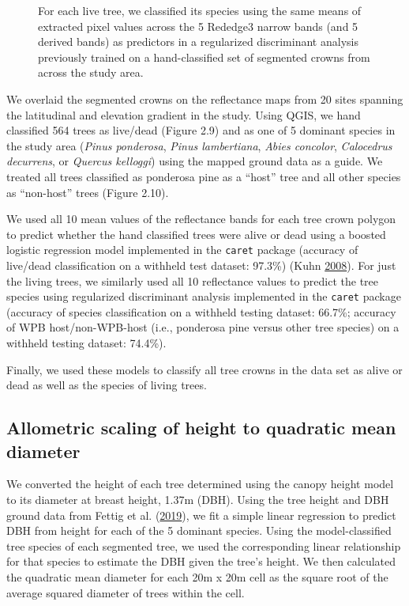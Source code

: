 \documentclass[twoside,12pt,final]{ucthesis-CA2012}
\begin{document}
\begin{ucmainmatter}
\begin{figure}
\caption{For each live tree, we classified its species using the same
means of extracted pixel values across the 5 Rededge3 narrow bands (and
5 derived bands) as predictors in a regularized discriminant analysis
previously trained on a hand-classified set of segmented crowns from
across the study area.}
\end{figure}
We overlaid the segmented crowns on the reflectance maps from 20 sites
spanning the latitudinal and elevation gradient in the study. Using
QGIS, we hand classified 564 trees as live/dead (Figure 2.9) and as one
of 5 dominant species in the study area (\emph{Pinus ponderosa},
\emph{Pinus lambertiana}, \emph{Abies concolor}, \emph{Calocedrus
decurrens}, or \emph{Quercus kelloggi}) using the mapped ground data as
a guide. We treated all trees classified as ponderosa pine as a ``host''
tree and all other species as ``non-host'' trees (Figure 2.10).

We used all 10 mean values of the reflectance bands for each tree crown
polygon to predict whether the hand classified trees were alive or dead
using a boosted logistic regression model implemented in the
\texttt{caret} package (accuracy of live/dead classification on a
withheld test dataset: 97.3\%) (Kuhn
\protect\hyperlink{ref-kuhn2008}{2008}). For just the living trees, we
similarly used all 10 reflectance values to predict the tree species
using regularized discriminant analysis implemented in the
\texttt{caret} package (accuracy of species classification on a withheld
testing dataset: 66.7\%; accuracy of WPB host/non-WPB-host (i.e.,
ponderosa pine versus other tree species) on a withheld testing dataset:
74.4\%).

Finally, we used these models to classify all tree crowns in the data
set as alive or dead as well as the species of living trees.

\subsection{Allometric scaling of height to quadratic mean
diameter}\label{allometric-scaling-of-height-to-quadratic-mean-diameter}

We converted the height of each tree determined using the canopy height
model to its diameter at breast height, 1.37m (DBH). Using the tree
height and DBH ground data from Fettig et al.
(\protect\hyperlink{ref-fettig2019}{2019}), we fit a simple linear
regression to predict DBH from height for each of the 5 dominant
species. Using the model-classified tree species of each segmented tree,
we used the corresponding linear relationship for that species to
estimate the DBH given the tree's height. We then calculated the
quadratic mean diameter for each 20m x 20m cell as the square root of
the average squared diameter of trees within the cell.


\end{ucmainmatter}
\end{document}

